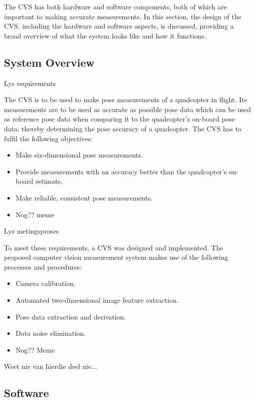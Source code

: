 The CVS has both hardware and software components, both of which are important to making accurate measurements. In this section, the design of the CVS, including the hardware and software aspects, is discussed, providing a broad overview of what the system looks like and how it functions. 

\subsection{System Overview}

Lys requirements

The CVS is to be used to make pose measurements of a quadcopter in flight. Its measurements are to be used as accurate as possible pose data which can be used as reference pose data when comparing it to the quadcopter's on-board pose data, thereby determining the pose accuracy of a quadcopter. The CVS has to fulfil the following objectives:

\begin{itemize}
  \item Make six-dimensional pose measurements.
  \item Provide measurements with an accuracy better than the quadcopter's on-board estimate.
  \item Make reliable, consistent pose measurements.
  \item Nog?? meme
\end{itemize}

Lys metingsproses

To meet these requirements, a CVS was designed and implemented. The proposed computer vision measurement system makes use of the following processes and procedures: 

\begin{itemize}
  \item Camera calibration.
  \item Automated two-dimensional image feature extraction.
  \item Pose data extraction and derivation.
  \item Data noise elimination. 
  \item Nog?? Meme
\end{itemize}

Weet nie van hierdie deel nie...

\subsection{Software}
\label{sec:cv-sys-software}

